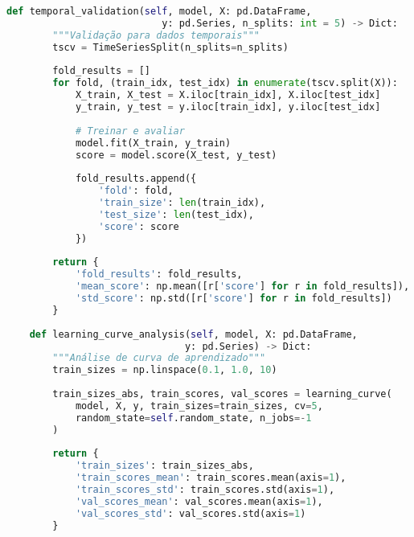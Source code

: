 \begin{pythonbox}
\begin{lstlisting}[language=Python]      
    def temporal_validation(self, model, X: pd.DataFrame, 
                           y: pd.Series, n_splits: int = 5) -> Dict:
        """Validação para dados temporais"""
        tscv = TimeSeriesSplit(n_splits=n_splits)
        
        fold_results = []
        for fold, (train_idx, test_idx) in enumerate(tscv.split(X)):
            X_train, X_test = X.iloc[train_idx], X.iloc[test_idx]
            y_train, y_test = y.iloc[train_idx], y.iloc[test_idx]
            
            # Treinar e avaliar
            model.fit(X_train, y_train)
            score = model.score(X_test, y_test)
            
            fold_results.append({
                'fold': fold,
                'train_size': len(train_idx),
                'test_size': len(test_idx),
                'score': score
            })
        
        return {
            'fold_results': fold_results,
            'mean_score': np.mean([r['score'] for r in fold_results]),
            'std_score': np.std([r['score'] for r in fold_results])
        }
    
    def learning_curve_analysis(self, model, X: pd.DataFrame, 
                               y: pd.Series) -> Dict:
        """Análise de curva de aprendizado"""
        train_sizes = np.linspace(0.1, 1.0, 10)
        
        train_sizes_abs, train_scores, val_scores = learning_curve(
            model, X, y, train_sizes=train_sizes, cv=5,
            random_state=self.random_state, n_jobs=-1
        )
        
        return {
            'train_sizes': train_sizes_abs,
            'train_scores_mean': train_scores.mean(axis=1),
            'train_scores_std': train_scores.std(axis=1),
            'val_scores_mean': val_scores.mean(axis=1),
            'val_scores_std': val_scores.std(axis=1)
        }
\end{lstlisting}
\end{pythonbox}
